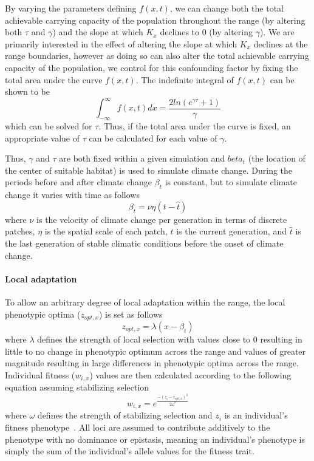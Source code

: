 \documentclass[11pt, oneside]{article}
\begin{document}
By varying the parameters defining $f(x,t)$, we can change both the total achievable carrying capacity of the population throughout the range (by altering both $\tau$ and $\gamma$) and the slope at which $K_{x}$ declines to $0$ (by altering $\gamma$). We are primarily interested in the effect of altering the slope at which $K_{x}$ declines at the range boundaries, however as doing so can also alter the total achievable carrying capacity of the population, we control for this confounding factor by fixing the total area under the curve $f(x,t)$. The indefinite integral of $f(x,t)$ can be shown to be
\begin{equation}
\int_{-\infty}^{\infty}f(x,t)dx = \frac{2ln(e^{\gamma\tau}+1)}{\gamma}
\end{equation}
which can be solved for $\tau$. Thus, if the total area under the curve is fixed, an appropriate value of $\tau$ can be calculated for each value of $\gamma$.

Thus, $\gamma$ and $\tau$ are both fixed within a given simulation and $beta_{t}$ (the location of the center of suitable habitat) is used to simulate climate change. During the periods before and after climate change $\beta_{t}$ is constant, but to simulate climate change it varies with time as follows
\begin{equation}
\beta_{t}=\nu\eta(t-\hat{t})
\end{equation}
where $\nu$ is the velocity of climate change per generation in terms of discrete patches, $\eta$ is the spatial scale of each patch, $t$ is the current generation, and $\hat{t}$ is the last generation of stable climatic conditions before the onset of climate change.

\paragraph{Local adaptation}
To allow an arbitrary degree of local adaptation within the range, the local phenotypic optima ($z_{opt,x}$) is set as follows
\begin{equation}
z_{opt,x}=\lambda(x-\beta_{t})
\end{equation}
where $\lambda$ defines the strength of local selection with values close to $0$ resulting in little to no change in phenotypic optimum across the range and values of greater magnitude resulting in large differences in phenotypic optima across the range. Individual fitness ($w_{i,x}$) values are then calculated according to the following equation assuming stabilizing selection
\begin{equation}
w_{i,x}=e^{\frac{-(z_{i}-z_{opt,x})^{2}}{2\omega^{2}}}
\end{equation}
where $\omega$ defines the strength of stabilizing selection and $z_{i}$ is an individual's fitness phenotype~\citep{lande1976natural}. All loci are assumed to contribute additively to the phenotype with no dominance or epistasis, meaning an individual's phenotype is simply the sum of the individual's allele values for the fitness trait.
\end{document}
